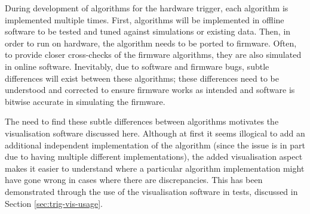 During development of algorithms for the hardware trigger, each algorithm is
implemented multiple times. First, algorithms will be implemented in offline
software to be tested and tuned against simulations or existing data. Then, in
order to run on hardware, the algorithm needs to be ported to firmware. Often, to
provide closer cross-checks of the firmware algorithms, they are also simulated
in online software. Inevitably, due to software and firmware bugs, subtle
differences will exist between these algorithms; these differences need to be
understood and corrected to ensure firmware works as intended and software is
bitwise accurate in simulating the firmware.

The need to find these subtle differences between algorithms motivates the
visualisation software discussed here. Although at first it seems illogical to
add an additional independent implementation of the algorithm (since the issue
is in part due to having multiple different implementations), the added
visualisation aspect makes it easier to understand where a particular algorithm
implementation might have gone wrong in cases where there are discrepancies.
This has been demonstrated through the use of the visualisation software in
tests, discussed in Section \ref{sec:trig-vis-usage}.
